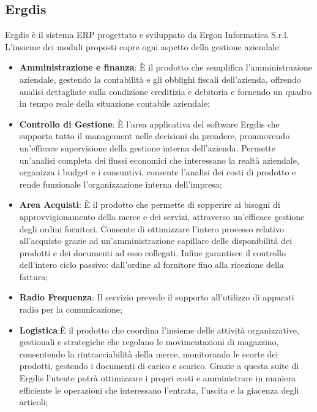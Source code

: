 \pagebreak
\subsection{Ergdis}

Ergdis è il sistema ERP progettato e sviluppato da Ergon Informatica S.r.l.
L'insieme dei moduli proposti copre ogni aspetto della gestione aziendale:

\begin{itemize}
	\item \textbf{Amministrazione e finanza}: È il prodotto che semplifica l’amministrazione aziendale, gestendo la contabilità e gli obblighi fiscali dell’azienda, offrendo analisi dettagliate sulla condizione creditizia e debitoria e fornendo un quadro in tempo reale della situazione contabile aziendale;
	
	\item \textbf{Controllo di Gestione}: È l’area applicativa del software Ergdis che supporta tutto il management nelle decisioni da prendere, promuovendo un’efficace supervisione della gestione interna dell’azienda. Permette un’analisi completa dei flussi economici che interessano la realtà aziendale, organizza i budget e i consuntivi, consente l’analisi dei costi di prodotto e rende funzionale l’organizzazione interna dell’impresa;
	
	\item \textbf{Area Acquisti}: È il prodotto che permette di sopperire ai bisogni di approvvigionamento della merce e dei servizi, attraverso un’efficace gestione degli ordini fornitori. Consente di ottimizzare l'intero processo relativo all’acquisto grazie ad un’amministrazione capillare delle disponibilità dei prodotti e dei documenti ad esso collegati. Infine garantisce il controllo dell’intero ciclo passivo: dall’ordine al fornitore fino alla ricezione della fattura;
	
	\item \textbf{Radio Frequenza}: Il servizio prevede il supporto all'utilizzo di apparati radio per la comunicazione;
	
	\item \textbf{Logistica}:È il prodotto che coordina l’insieme delle attività organizzative, gestionali e strategiche che regolano le movimentazioni di magazzino, consentendo la rintracciabilità della merce, monitorando le scorte dei prodotti, gestendo i documenti di carico e scarico. Grazie a questa suite di Ergdis l’utente potrà ottimizzare i propri costi e amministrare in maniera efficiente le operazioni che interessano l’entrata, l’uscita e la giacenza degli articoli;
	

\end{itemize}
